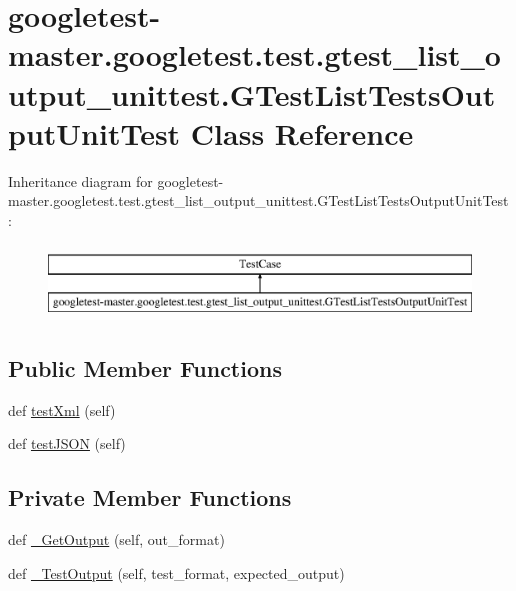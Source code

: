 \hypertarget{classgoogletest-master_1_1googletest_1_1test_1_1gtest__list__output__unittest_1_1_g_test_list_tests_output_unit_test}{}\section{googletest-\/master.googletest.\+test.\+gtest\+\_\+list\+\_\+output\+\_\+unittest.\+G\+Test\+List\+Tests\+Output\+Unit\+Test Class Reference}
\label{classgoogletest-master_1_1googletest_1_1test_1_1gtest__list__output__unittest_1_1_g_test_list_tests_output_unit_test}
Inheritance diagram for googletest-\/master.googletest.\+test.\+gtest\+\_\+list\+\_\+output\+\_\+unittest.\+G\+Test\+List\+Tests\+Output\+Unit\+Test\+:\begin{figure}[H]
\begin{center}
\leavevmode
\includegraphics[height=2.000000cm]{dd/d31/classgoogletest-master_1_1googletest_1_1test_1_1gtest__list__output__unittest_1_1_g_test_list_tests_output_unit_test}
\end{center}
\end{figure}
\subsection*{Public Member Functions}
\begin{DoxyCompactItemize}
\item 
def \mbox{\hyperlink{classgoogletest-master_1_1googletest_1_1test_1_1gtest__list__output__unittest_1_1_g_test_list_tests_output_unit_test_a9cef89f959b41d46091ea72532da26cc}{test\+Xml}} (self)
\item 
def \mbox{\hyperlink{classgoogletest-master_1_1googletest_1_1test_1_1gtest__list__output__unittest_1_1_g_test_list_tests_output_unit_test_ae73731bdfffec826ff1fdcc2086ca0ec}{test\+J\+S\+ON}} (self)
\end{DoxyCompactItemize}
\subsection*{Private Member Functions}
\begin{DoxyCompactItemize}
\item 
def \mbox{\hyperlink{classgoogletest-master_1_1googletest_1_1test_1_1gtest__list__output__unittest_1_1_g_test_list_tests_output_unit_test_aa1aa65e5378d84c7b155ed16c05cd9ce}{\+\_\+\+Get\+Output}} (self, out\+\_\+format)
\item 
def \mbox{\hyperlink{classgoogletest-master_1_1googletest_1_1test_1_1gtest__list__output__unittest_1_1_g_test_list_tests_output_unit_test_ae81ad6730290c2e9773fd116b6180cbe}{\+\_\+\+Test\+Output}} (self, test\+\_\+format, expected\+\_\+output)
\end{DoxyCompactItemize}


